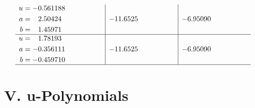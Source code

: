 \documentclass[1p]{elsarticle_modified}
\theoremstyle{definition}
\begin{document}
$$\begin{array}{c|c|c}
\begin{aligned}
u &= -0.561188\phantom{ +0.000000I} \\
a &= \phantom{-}2.50424\phantom{ +0.000000I} \\
b &= \phantom{-}1.45971\phantom{ +0.000000I}\end{aligned}
 & -11.6525\phantom{ +0.000000I} & -6.95090\phantom{ +0.000000I} \\ \hline\begin{aligned}
u &= \phantom{-}1.78193\phantom{ +0.000000I} \\
a &= -0.356111\phantom{ +0.000000I} \\
b &= -0.459710\phantom{ +0.000000I}\end{aligned}
 & -11.6525\phantom{ +0.000000I} & -6.95090\phantom{ +0.000000I}\\
 \hline 
 \end{array}$$\newpage
\newpage\renewcommand{\arraystretch}{1}
\centering \section*{ V. u-Polynomials}
\end{document}
